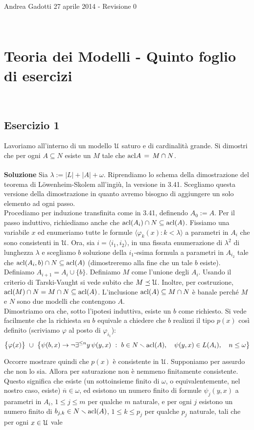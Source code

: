 \documentclass[10pt,a4paper]{article}
\def\phi{\varphi}
\def\U{\EuScript U}
\def\<{\langle}
\def\>{\rangle}
\def\E{\exists}
\def\imp{\rightarrow}
\def\acl{{\rm acl}}
\def\sm{\smallsetminus}
\begin{document}
\noindent Andrea Gadotti \hfill 27 aprile 2014 - Revisione 0 

\

\section*{Teoria dei Modelli - Quinto foglio di esercizi}

\

\subsection*{Esercizio 1}
Lavoriamo all'interno di un modello $\U$ saturo e di cardinalità grande. Si dimostri che per ogni $A\subseteq N$ esiste un $M$ tale che $\acl A\,=\,M\cap N$.\\
\\
\noindent\textbf{Soluzione} Sia $\lambda:=|L|+|A|+\omega$. Riprendiamo lo schema della dimostrazione del teorema di Löwenheim-Skolem all'ingiù, la versione in 3.41. Scegliamo questa versione della dimostrazione in quanto avremo bisogno di aggiungere un solo elemento ad ogni passo.\\
Procediamo per induzione transfinita come in 3.41, definendo $A_0:=A$. Per il passo induttivo, richiediamo anche che $\acl(A_i)\cap N\subseteq\acl(A)$. Fissiamo una variabile $x$ ed enumeriamo tutte le formule $\langle \phi_k(x): k < \lambda \rangle$ a parametri in $A_i$ che sono consistenti in $\U$. Ora, sia $i=\<i_1,i_2\>$, in una fissata enumerazione di $\lambda^2$  di lunghezza $\lambda$ e scegliamo $b$ soluzione della $i_1$-esima formula a parametri in $A_{i_2}$ tale che $\acl(A_i,b)\cap N\subseteq\acl(A)$ (dimostreremo alla fine che un tale $b$ esiste). Definiamo $A_{i+1}=A_i\cup\{b\}$. Definiamo $M$ come l'unione degli $A_i$. Usando il criterio di Tarski-Vaught si vede subito che $M \preceq \U$. Inoltre, per costruzione, $\acl(M) \cap N = M \cap N \subseteq \acl(A)$. L'inclusione $\acl(A) \subseteq M \cap N$ è banale perché $M$ e $N$ sono due modelli che contengono $A$.\\
Dimostriamo ora che, sotto l'ipotesi induttiva, esiste un $b$ come richiesto. Si vede facilmente che la richiesta su $b$ equivale a chiedere che $b$ realizzi il tipo $p(x)$ così definito (scriviamo $\phi$ al posto di $\phi_{i_1}$):
$$\big\{\phi(x)\big\} \ \cup \ \big\{\psi(b,x)\imp\neg\E^{\le n}y\,\psi(y,x)\ :\ b\in N\sm\acl(A),\ \ \ \psi(y,x)\in L(A_i),\ \ \ n\le\omega\big\}$$

Occorre mostrare quindi che $p(x)$ è consistente in $\U$. Supponiamo per assurdo che non lo sia. Allora per saturazione non è nemmeno finitamente consistente. Questo significa che esiste (un sottoinsieme finito di $\omega$, o equivalentemente, nel nostro caso, esiste) $\overline{n} \in \omega$, ed esistono un numero finito di formule $\psi_j(y,x)$ a parametri in $A_i$, $1 \leq j \leq m$ per qualche $m$ naturale, e per ogni $j$ esistono un numero finito di $b_{j,k} \in N \sm \acl(A)$, $1 \leq k \leq p_j$ per qualche $p_j$ naturale, tali che per ogni $x \in \U$ vale 
\end{document}
